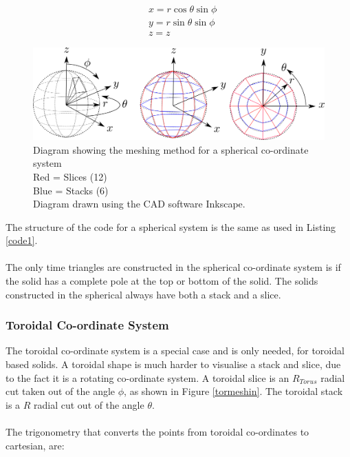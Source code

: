 \documentclass[12pt,a4paper]{article}
\begin{document}
\begin{equation}
\begin{aligned}
& x = r \cos{\theta}\sin{\phi}\\
& y = r \sin{\theta}\sin{\phi} \\
& z = z
\end{aligned}
\label{trigsph}
\end{equation}
\begin{figure}[h!]
\centering
\includegraphics[scale=0.5]{Images//Coords//sph.png}
\caption[width=\columnwidth]{Diagram showing the meshing method for a spherical co-ordinate system\\
Red = Slices (12)\\
Blue = Stacks (6)\\
 Diagram drawn using the CAD software Inkscape.}
\label{sphmeshin}
\end{figure}

\noindent The structure of the code for a spherical system is the same as used in Listing \ref{code1}.\\\\
\noindent The only time triangles are constructed in the spherical co-ordinate system is if the solid has a complete pole at the top or bottom of the solid. The solids constructed in the spherical always have both a stack and a slice.

%

\newpage
\subsubsection{Toroidal Co-ordinate System}

The toroidal co-ordinate system is a special case and is only needed, for toroidal based solids. A toroidal shape is much harder to visualise a stack and slice, due to the fact it is a rotating co-ordinate system. A toroidal slice is an $R_{Torus}$ radial cut taken out of the angle $\phi$, as shown in Figure \ref{tormeshin}. The toroidal stack is a $R$ radial cut out of the angle $\theta$. 
\\\\
The trigonometry that converts the points from toroidal co-ordinates to cartesian, are:
\end{document}
